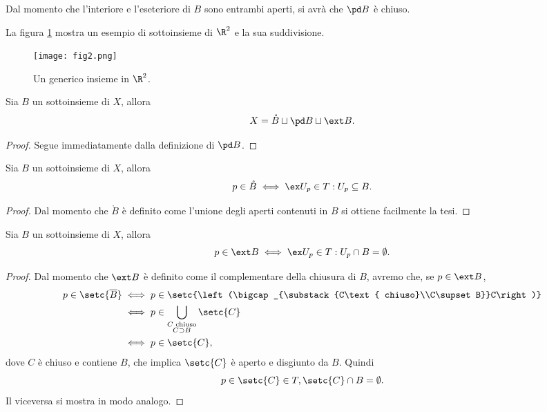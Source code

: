 \begin{oss}
	Dal momento che l'interiore e l'eseteriore di \(B\) sono entrambi aperti, si avrà che \(\pd B\) è chiuso.
\end{oss}

\begin{oss}
	La figura \ref{fig:fig2} mostra un esempio di sottoinsieme di \(\R^2\) e la sua suddivisione.
\end{oss}

\begin{figure}[tp]
	\begin{centering}
		\texttt{[image: fig2.png]}
		\caption{Un generico insieme in \(\R^2\).}
		\label{fig:fig2}
	\end{centering}
\end{figure}

\begin{lem}\label{lem:intEst1}
	Sia \(B\) un sottoinsieme di \(X\), allora
	\[
		X=\mathring{B}\sqcup \pd B\sqcup \ext B.
	\]
\end{lem}

\begin{proof}
	Segue immediatamente dalla definizione di \(\pd B\).
\end{proof}

\begin{lem}\label{lem:intEst2}
	Sia \(B\) un sottoinsieme di \(X\), allora
	\[
		p\in \mathring{B} \iff \ex U_p\in T:U_p\subseteq B.
	\]
\end{lem}

\begin{proof}
	Dal momento che \(\mathring{B}\) è definito come l'unione degli aperti contenuti in \(B\) si ottiene facilmente la tesi.
\end{proof}

\begin{lem}\label{lem:intEst3}
	Sia \(B\) un sottoinsieme di \(X\), allora
	\[
		p\in \ext B\iff \ex U_p\in T:U_p\cap B=\emptyset.
	\]
\end{lem}

\begin{proof}
	Dal momento che \(\ext B\) è definito come il complementare della chiusura di \(B\), avremo che, se \(p\in \ext B\),
	\[
		\begin{split}
			p\in \setc{\overline{B}} & \iff p\in \setc{\left(\bigcap_{\substack{C\text{ chiuso}\\C\supset B}}C\right)}\\
			& \iff p\in \bigcup_{\substack{C\text{ chiuso}\\C\supset B}}\setc{C}\\
			& \iff p\in \setc{C},
		\end{split}
	\]
	dove \(C\) è chiuso e contiene \(B\), che implica \(\setc{C}\) è aperto e disgiunto da \(B\).
	Quindi
	\[
		p\in \setc{C}\in T,\setc{C}\cap B=\emptyset.
	\]
	Il viceversa si mostra in modo analogo.
\end{proof}

